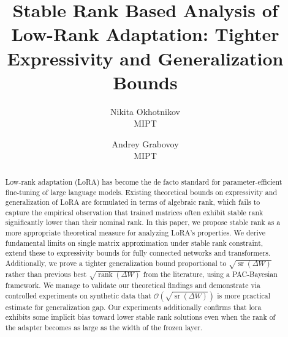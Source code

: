 \documentclass[a4paper,14pt]{extarticle}
\title{Stable Rank Based Analysis of Low-Rank Adaptation: Tighter Expressivity and Generalization Bounds}
\author{Nikita Okhotnikov\\
	MIPT \\
\and
	Andrey Grabovoy\\
	MIPT \\
}
\date{}
\DeclareMathOperator{\rank}{rank}
\DeclareMathOperator{\sr}{sr}
\begin{document}
    \maketitle
    \begin{abstract}
        
        Low-rank adaptation (LoRA) has become the de facto standard for parameter-efficient fine-tuning of large language models. 
        Existing theoretical bounds on expressivity and generalization of LoRA are formulated in terms of algebraic rank, which fails to capture the empirical observation that trained matrices often exhibit stable rank significantly lower than their nominal rank. 
        In this paper, we propose stable rank as a more appropriate theoretical measure for analyzing LoRA's properties. 
        We derive fundamental limits on single matrix approximation under stable rank constraint, extend these to expressivity bounds for fully connected networks and transformers. 
        Additionally, we prove a tighter generalization bound proportional to $\sqrt{\sr(\Delta W)}$ rather than previous best $\sqrt{\rank(\Delta W)}$ from the literature, using a PAC-Bayesian framework. 
        We manage to validate our theoretical findings and demonstrate via controlled experiments on synthetic data that $\mathcal{O}(\sqrt{\sr(\Delta W)})$ is more practical estimate for generalization gap. Our experiments additionally confirms that lora exhibits some implicit bias toward lower stable rank solutions even when the rank of the adapter becomes as large as the width of the frozen layer.
    \end{abstract}
\end{document}
